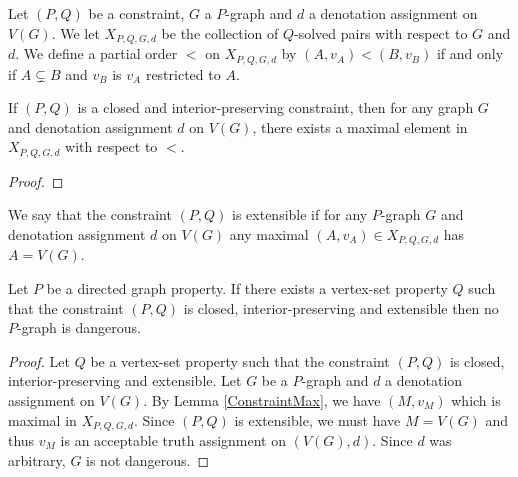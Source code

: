 \begin{defn}
Let $(P, Q)$ be a constraint, $G$ a $P$-graph and $d$ a denotation
assignment on $V(G)$. We let $X_{P, Q, G, d}$ be the collection of
$Q$-solved pairs with respect to $G$ and $d$.  We define a partial order $<$
on $X_{P, Q, G, d}$ by $(A, v_A) < (B, v_B)$ if and only if $A \subsetneq B$ and $v_B$ is $v_A$ restricted to $A$.
\end{defn}

\begin{lem}\label{ConstraintMax}
If $(P, Q)$ is a closed and interior-preserving constraint,
then for any graph $G$ and denotation assignment $d$ on $V(G)$, there exists
a maximal element in $X_{P, Q, G, d}$ with respect to $<$.
\end{lem}
\begin{proof}
\end{proof}

\begin{defn}
We say that the constraint $(P, Q)$ is extensible if for any
$P$-graph $G$ and denotation assignment $d$ on $V(G)$ any maximal $(A, v_A) \in
X_{P, Q, G, d}$ has $A = V(G)$.
\end{defn}

\begin{lem}
Let $P$ be a directed graph property.  If there exists a
vertex-set property $Q$ such that the constraint $(P, Q)$ is closed,
interior-preserving and extensible then no $P$-graph is dangerous.
\end{lem}
\begin{proof}
Let $Q$ be a vertex-set property such that the constraint $(P, Q)$
is closed, interior-preserving and extensible.  Let $G$ be a $P$-graph and $d$ a
denotation assignment on $V(G)$. By Lemma \ref{ConstraintMax}, we have $(M, v_M)$ which is maximal in $X_{P, Q, G, d}$.  Since $(P,Q)$ is extensible, we must have $M = V(G)$ and thus $v_M$ is an acceptable truth assignment on $(V(G),
d)$.  Since $d$ was arbitrary, $G$ is not dangerous.
\end{proof}
